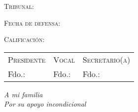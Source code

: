 \begin{titlepage}
	{\flushright \LARGE \textsc{Tribunal:}}
	
	\hspace*{1cm}{\Large Presidente: \hrulefill}
	
	\hspace*{1cm}{\Large Vocal: \hrulefill}
	
	\hspace*{1cm}{\Large Secretario(a): \hrulefill}
	
	{\flushright \LARGE \textsc{Fecha de defensa:} \hrulefill}
	
	{\flushright \LARGE \textsc{Calificación:} \hrulefill}
	
	\begin{center}
		\begin{tabularx}{\linewidth}{X X X}
			{\large \textsc{Presidente}} & {\large \textsc{Vocal}} & {\large \textsc{Secretario(a)}}\\[2.5cm]
			Fdo.: & Fdo.: & Fdo.:		
		\end{tabularx}
	\end{center}
	\cleardoublepage
\end{titlepage}




\null{}
\begin{flushright}
\emph{A mi familia \\ %
Por su apoyo incondicional}
\end{flushright}
\null
\cleardoublepage


%
